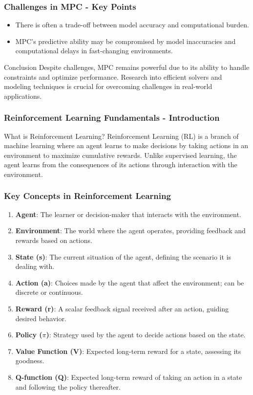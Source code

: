 \documentclass[aspectratio=169]{beamer}
\begin{document}
\begin{frame}[fragile]
    \frametitle{Challenges in MPC - Key Points}
    \begin{itemize}
        \item There is often a trade-off between model accuracy and computational burden.
        \item MPC's predictive ability may be compromised by model inaccuracies and computational delays in fast-changing environments.
    \end{itemize}

    \begin{block}{Conclusion}
        Despite challenges, MPC remains powerful due to its ability to handle constraints and optimize performance. Research into efficient solvers and modeling techniques is crucial for overcoming challenges in real-world applications.
    \end{block}
\end{frame}

\begin{frame}[fragile]
    \frametitle{Reinforcement Learning Fundamentals - Introduction}
    \begin{block}{What is Reinforcement Learning?}
        Reinforcement Learning (RL) is a branch of machine learning where an agent learns to make decisions by taking actions in an environment to maximize cumulative rewards. 
        Unlike supervised learning, the agent learns from the consequences of its actions through interaction with the environment.
    \end{block}
\end{frame}

\begin{frame}[fragile]
    \frametitle{Key Concepts in Reinforcement Learning}
    \begin{enumerate}
        \item \textbf{Agent}: The learner or decision-maker that interacts with the environment.
        \item \textbf{Environment}: The world where the agent operates, providing feedback and rewards based on actions.
        \item \textbf{State (s)}: The current situation of the agent, defining the scenario it is dealing with.
        \item \textbf{Action (a)}: Choices made by the agent that affect the environment; can be discrete or continuous.
        \item \textbf{Reward (r)}: A scalar feedback signal received after an action, guiding desired behavior.
        \item \textbf{Policy ($\pi$)}: Strategy used by the agent to decide actions based on the state.
        \item \textbf{Value Function (V)}: Expected long-term reward for a state, assessing its goodness.
        \item \textbf{Q-function (Q)}: Expected long-term reward of taking an action in a state and following the policy thereafter.
    \end{enumerate}
\end{frame}
\end{document}
